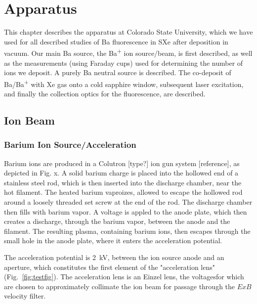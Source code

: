 \chapter{Apparatus}

This chapter describes the apparatus at Colorado State University, which we have used for all described studies of Ba fluorescence in SXe after deposition in vacuum.  Our main Ba source, the Ba\textsuperscript{+} ion source/beam, is first described, as well as the measurements (using Faraday cups) used for determining the number of ions we deposit.  A purely Ba neutral source is described.  The co-deposit of Ba/Ba\textsuperscript{+} with Xe gas onto a cold sapphire window, subsequent laser excitation, and finally the collection optics for the fluorescence, are described.

%

\section{Ion Beam}

\subsection{Barium Ion Source/Acceleration}

Barium ions are produced in a Colutron [type?] ion gun system [reference], as depicted in Fig. x.  A solid barium charge is placed into the hollowed end of a stainless steel rod, which is then inserted into the discharge chamber, near the hot filament.  The heated barium vaproizes, allowed to escape the hollowed rod around a loosely threaded set screw at the end of the rod.  The discharge chamber then fills with barium vapor.  A voltage is appled to the anode plate, which then creates a discharge, through the barium vapor, between the anode and the filament.  The resulting plasma, containing barium ions, then escapes through the small hole in the anode plate, where it enters the acceleration potential.  

The acceleration potential is 2~kV, between the ion source anode and an aperture, which constitutes the first element of the "acceleration lens" (Fig.~\ref{fig:testfig}).  The acceleration lens is an Einzel lens, the voltagesfor which are chosen to approximately collimate the ion beam for passage through the $E x B$ velocity filter.

